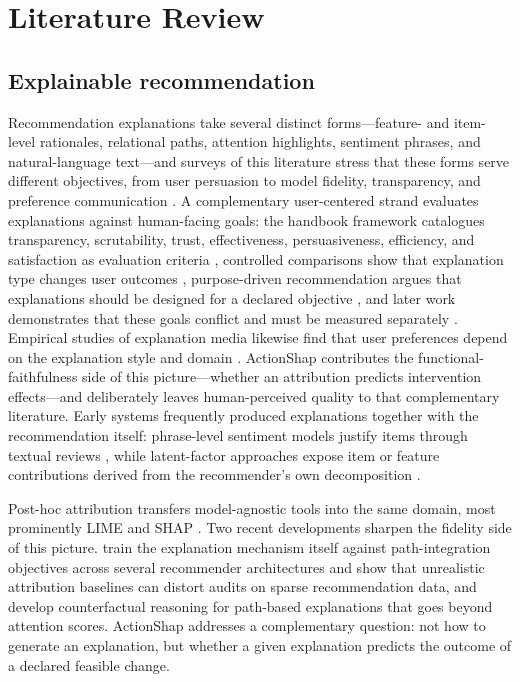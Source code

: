 \documentclass[manuscript,screen,review,anonymous]{acmart}
\begin{document}
\section{Literature Review}
\subsection{Explainable recommendation}
Recommendation explanations take several distinct forms---feature- and item-level rationales, relational paths, attention highlights, sentiment phrases, and natural-language text---and surveys of this literature stress that these forms serve different objectives, from user persuasion to model fidelity, transparency, and preference communication \citep{zhang2020survey}. A complementary user-centered strand evaluates explanations against human-facing goals: the handbook framework catalogues transparency, scrutability, trust, effectiveness, persuasiveness, efficiency, and satisfaction as evaluation criteria \citep{tintarev2015explaining}, controlled comparisons show that explanation type changes user outcomes \citep{gedikli2014explain}, purpose-driven recommendation argues that explanations should be designed for a declared objective \citep{jannach2016purpose}, and later work demonstrates that these goals conflict and must be measured separately \citep{balog2020explanation}. Empirical studies of explanation media likewise find that user preferences depend on the explanation style and domain \citep{jeyakumar2020explain}. ActionShap contributes the functional-faithfulness side of this picture---whether an attribution predicts intervention effects---and deliberately leaves human-perceived quality to that complementary literature. Early systems frequently produced explanations together with the recommendation itself: phrase-level sentiment models justify items through textual reviews \citep{zhang2014}, while latent-factor approaches expose item or feature contributions derived from the recommender's own decomposition \citep{peake2018,nobrega2019}.

Post-hoc attribution transfers model-agnostic tools into the same domain, most prominently LIME \citep{ribeiro2016} and SHAP \citep{lundberg2017}. Two recent developments sharpen the fidelity side of this picture. \citet{barkan2026spinrec} train the explanation mechanism itself against path-integration objectives across several recommender architectures and show that unrealistic attribution baselines can distort audits on sparse recommendation data, and \citet{li2024tkde} develop counterfactual reasoning for path-based explanations that goes beyond attention scores. ActionShap addresses a complementary question: not how to generate an explanation, but whether a given explanation predicts the outcome of a declared feasible change.
\end{document}
